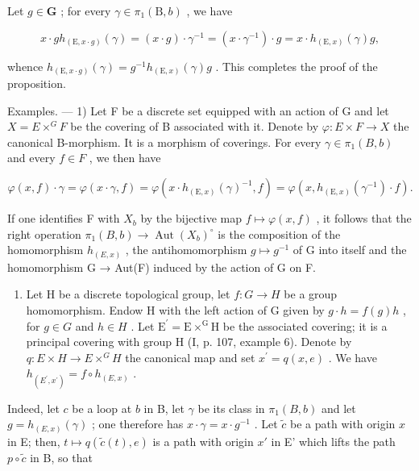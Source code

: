 Let \(g\in \mathbf{G}\) ; for every \(\gamma \in \pi_1(\mathrm{B},b)\) , we have

\[
x \cdot g h _ {(\mathrm{E}, x \cdot g)} (\gamma) = (x \cdot g) \cdot \gamma^ {- 1} = (x \cdot \gamma^ {- 1}) \cdot g = x \cdot h _ {(\mathrm{E}, x)} (\gamma) g,
\]

whence \(h_{(\mathrm{E},x\cdot g)}(\gamma)=g^{-1}h_{(\mathrm{E},x)}(\gamma)g\) . This completes the proof of the proposition.

Examples. --- 1) Let F be a discrete set equipped with an action of G and let \(X = E \times^{G} F\) be the covering of B associated with it. Denote by \(\varphi: E \times F \to X\) the canonical B-morphism. It is a morphism of coverings. For every \(\gamma \in \pi_{1}(B, b)\) and every \(f \in F\) , we then have

\[
\varphi (x, f) \cdot \gamma = \varphi (x \cdot \gamma , f) = \varphi (x \cdot h _ {(\mathrm{E}, x)} (\gamma) ^ {- 1}, f) = \varphi (x, h _ {(\mathrm{E}, x)} (\gamma^ {- 1}) \cdot f).\tag{5}
\]

If one identifies F with \(X_{b}\) by the bijective map \(f \mapsto \varphi(x, f)\) , it follows that the right operation \(\pi_{1}(B, b) \to \operatorname{Aut}(X_{b})^{\circ}\) is the composition of the homomorphism \(h_{(E,x)}\) , the antihomomorphism \(g \mapsto g^{-1}\) of G into itself and the homomorphism G → Aut(F) induced by the action of G on F.

\begin{enumerate}
\def\labelenumi{\arabic{enumi})}
\setcounter{enumi}{1}
\tightlist
\item
  Let H be a discrete topological group, let \(f\colon G\to H\) be a group homomorphism. Endow H with the left action of G given by \(g\cdot h=f(g)h\) , for \(g\in G\) and \(h\in H\) . Let \(\mathrm{E}^{\prime}=\mathrm{E}\times^{\mathrm{G}}\mathrm{H}\) be the associated covering; it is a principal covering with group H (I, p. 107, example 6). Denote by \(q\colon E\times H\to E\times^{G}H\) the canonical map and set \(x^{\prime}=q(x,e)\) . We have \(h_{(E^{\prime},x^{\prime})}=f\circ h_{(E,x)}\) .
\end{enumerate}

Indeed, let \(c\) be a loop at \(b\) in B, let \(\gamma\) be its class in \(\pi_1(B,b)\) and let \(g = h_{(E,x)}(\gamma)\) ; one therefore has \(x \cdot \gamma = x \cdot g^{-1}\) . Let \(\widetilde{c}\) be a path with origin \(x\) in E; then, \(t \mapsto q(\widetilde{c}(t), e)\) is a path with origin \(x'\) in E' which lifts the path \(p \circ \widetilde{c}\) in B, so that

